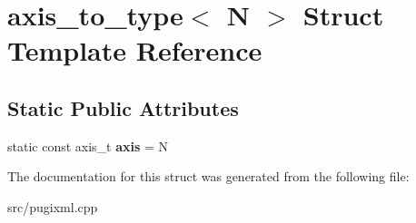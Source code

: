 \hypertarget{structaxis__to__type}{}\section{axis\+\_\+to\+\_\+type$<$ N $>$ Struct Template Reference}
\label{structaxis__to__type}
\subsection*{Static Public Attributes}
\begin{DoxyCompactItemize}
\item 
\mbox{\label{structaxis__to__type_ac9d75681918ad98c980db0f49b570b50}} 
static const axis\+\_\+t {\bfseries axis} = N
\end{DoxyCompactItemize}


The documentation for this struct was generated from the following file\+:\begin{DoxyCompactItemize}
\item 
src/pugixml.\+cpp\end{DoxyCompactItemize}
